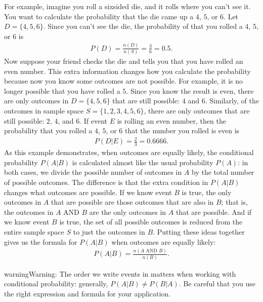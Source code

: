 \documentclass[letterpaper,10pt,english]{jupyterBook}
\begin{document}
\sphinxAtStartPar
For example, imagine you roll a six\sphinxhyphen{}sided die, and it rolls where you can’t see it. You want to calculate the probability that the die came up a \(4\), \(5\), or \(6\). Let \(D = \{4, 5, 6\}\). Since you can’t see the die, the probability of that you rolled a \(4\), \(5\), or \(6\) is
\begin{equation*}
\begin{split} P(D) = \frac{n(D)}{n(S)} = \frac{3}{6} = 0.5. \end{split}
\end{equation*}
\sphinxAtStartPar
Now suppose your friend checks the die and tells you that you have rolled an even number. This extra information changes how you calculate the probability because now you know some outcomes are not possible. For example, it is no longer possible that you have rolled a \(5\). Since you know the result is even, there are only  outcomes in \(D = \{4, 5, 6\}\) that are still possible: \(4\) and \(6\). Similarly, of the outcomes in sample space \(S = \{1, 2, 3, 4, 5, 6\}\), there are only  outcomes that are still possible: \(2\), \(4\), and \(6\). If event \(E\) is rolling an even number, then the probability that you rolled a \(4\), \(5\), or \(6\)  that the number you rolled is even is
\begin{equation*}
\begin{split} P(D|E) = \frac{2}{3} = 0.6666. \end{split}
\end{equation*}
\sphinxAtStartPar
As this example demonstrates, when outcomes are equally likely, the conditional probability \(P(A|B)\) is calculated almost like the usual probability \(P(A)\): in both cases, we divide the possible number of outcomes in \(A\) by the total number of possible outcomes. The difference is that the extra condition in \(P(A|B)\) changes what outcomes are possible. If we know event \(B\) is true, the only outcomes in \(A\) that are possible are those outcomes that are also in \(B\); that is, the outcomes in \(A \text{ AND } B\) are the only outcomes in \(A\) that are possible. And if we know event \(B\) is true, the set of all possible outcomes is reduced from the entire sample space \(S\) to just the outcomes in \(B\). Putting these ideas together gives us the formula for \(P(A|B)\) when outcomes are equally likely:
\begin{equation*}
\begin{split} P(A|B) = \frac{n(A \text{ AND } B)}{n(B)}. \end{split}
\end{equation*}
\begin{sphinxadmonition}{warning}{Warning:}
\sphinxAtStartPar
The order we write events in matters when working with conditional probability: generally, \(P(A|B) \neq P(B|A)\). Be careful that you use the right expression and formula for your application.
\end{sphinxadmonition}
\end{document}
